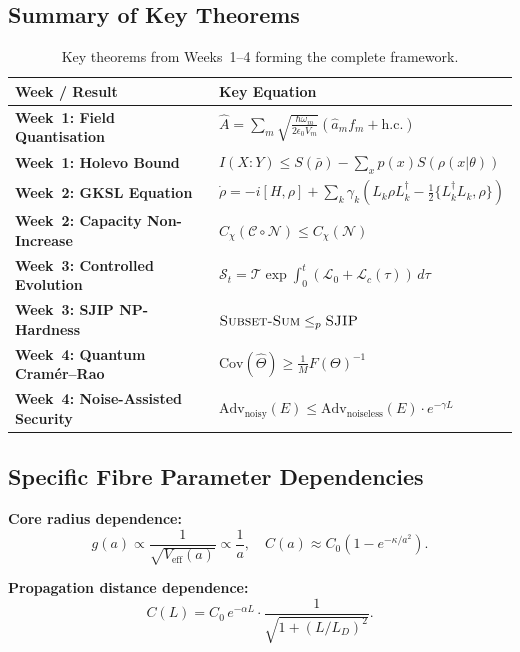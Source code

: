 \documentclass[journal,twocolumn]{IEEEtran}
\theoremstyle{definition}
\theoremstyle{plain}
\begin{document}
\subsection{Summary of Key Theorems}

\begin{table}[H]
\centering
\caption{Key theorems from Weeks~1--4 forming the complete framework.}
\renewcommand{\arraystretch}{1.4}
\begin{tabular}{>{\bfseries}l p{5cm}}
\toprule
\textbf{Week / Result} & \textbf{Key Equation} \\
\midrule
Week~1: Field Quantisation
  & $\hat{A}=\sum_m\sqrt{\frac{\hbar\omega_m}{2\epsilon_0 V_m}}
    (\hat{a}_m f_m+\mathrm{h.c.})$ \\[4pt]
Week~1: Holevo Bound
  & $I(X{:}Y)\le S(\bar\rho)-\sum_x p(x)S(\rho(x|\theta))$ \\[4pt]
Week~2: GKSL Equation
  & $\dot\rho=-i[H,\rho]+\sum_k\gamma_k(L_k\rho L_k^\dagger
    -\frac{1}{2}\{L_k^\dagger L_k,\rho\})$ \\[4pt]
Week~2: Capacity Non-Increase
  & $C_\chi(\mathcal{C}\circ\mathcal{N})\le C_\chi(\mathcal{N})$ \\[4pt]
Week~3: Controlled Evolution
  & $\mathcal{S}_t=\mathcal{T}\exp\int_0^t
    (\mathcal{L}_0+\mathcal{L}_c(\tau))\,d\tau$ \\[4pt]
Week~3: SJIP NP-Hardness
  & $\textsc{Subset-Sum}\le_p\textsc{SJIP}$ \\[4pt]
Week~4: Quantum Cram\'{e}r--Rao
  & $\mathrm{Cov}(\hat\Theta)\ge\frac{1}{M}F(\Theta)^{-1}$ \\[4pt]
Week~4: Noise-Assisted Security
  & $\mathrm{Adv}_{\mathrm{noisy}}(E)\le
    \mathrm{Adv}_{\mathrm{noiseless}}(E)\cdot e^{-\gamma L}$ \\
\bottomrule
\end{tabular}
\end{table}

\subsection{Specific Fibre Parameter Dependencies}

\textbf{Core radius dependence:}
\begin{equation}
  g(a)\propto\frac{1}{\sqrt{V_{\mathrm{eff}}(a)}}\propto\frac{1}{a},\quad
  C(a)\approx C_0\!\left(1-e^{-\kappa/a^2}\right).
\end{equation}

\textbf{Propagation distance dependence:}
\begin{equation}
  C(L)=C_0\,e^{-\alpha L}\cdot\frac{1}{\sqrt{1+(L/L_D)^2}}.
\end{equation}
\end{document}
